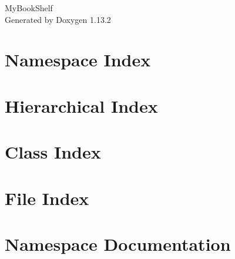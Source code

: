\documentclass[twoside]{book}
\newcommand{\+}{\discretionary{\mbox{\scriptsize$\hookleftarrow$}}{}{}}
\newcommand{\clearemptydoublepage}{%
    \newpage{\pagestyle{empty}\cleardoublepage}%
  }
\begin{document}
  \raggedbottom
    \hypersetup{pageanchor=false,
                bookmarksnumbered=true,
                pdfencoding=unicode
               }
  \begin{titlepage}
  \vspace*{7cm}
  \begin{center}%
  {\Large My\+Book\+Shelf}\\
  \vspace*{1cm}
  {\large Generated by Doxygen 1.13.2}\\
  \end{center}
  \end{titlepage}
  \clearemptydoublepage
  \tableofcontents
  \clearemptydoublepage
  \hypersetup{pageanchor=true}

\chapter{Namespace Index}

\chapter{Hierarchical Index}

\chapter{Class Index}

\chapter{File Index}

\chapter{Namespace Documentation}





\end{document}
